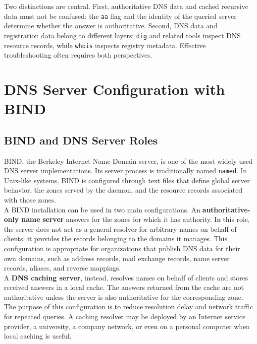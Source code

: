 \documentclass{scrbook}
\begin{document}
	Two distinctions are central. First, authoritative DNS data and cached recursive data must not be confused: the \texttt{aa} flag and the identity of the queried server determine whether the answer is authoritative. Second, DNS data and registration data belong to different layers: \texttt{dig} and related tools inspect DNS resource records, while \texttt{whois} inspects registry metadata. Effective troubleshooting often requires both perspectives.
	
	\chapter{DNS Server Configuration with BIND}
	
	\section{BIND and DNS Server Roles}
	
	BIND, the Berkeley Internet Name Domain server, is one of the most widely used DNS server implementations. Its server process is traditionally named \texttt{named}. In Unix-like systems, BIND is configured through text files that define global server behavior, the zones served by the daemon, and the resource records associated with those zones.\\
	
	A BIND installation can be used in two main configurations. An \textbf{authoritative-only name server} answers for the zones for which it has authority. In this role, the server does not act as a general resolver for arbitrary names on behalf of clients: it provides the records belonging to the domains it manages. This configuration is appropriate for organizations that publish DNS data for their own domains, such as address records, mail exchange records, name server records, aliases, and reverse mappings.\\
	
	A \textbf{DNS caching server}, instead, resolves names on behalf of clients and stores received answers in a local cache. The answers returned from the cache are not authoritative unless the server is also authoritative for the corresponding zone. The purpose of this configuration is to reduce resolution delay and network traffic for repeated queries. A caching resolver may be deployed by an Internet service provider, a university, a company network, or even on a personal computer when local caching is useful.\\
	
\end{document}
